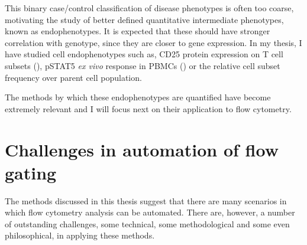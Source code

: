 This binary case/control classification of disease phenotypes is often too coarse, motivating the study of better defined quantitative intermediate phenotypes, known as endophenotypes.
It is expected that these should have stronger correlation with genotype, since they are closer to gene expression.
In my thesis, I have studied cell endophenotypes such as, CD25 protein expression on T cell subsets (), pSTAT5 \textit{ex vivo} response in \glspl{PBMC} () or the relative cell subset frequency over parent cell population.

The methods by which these endophenotypes are quantified have become extremely relevant and I will focus next on their application to flow cytometry.



\section{ Challenges in automation of flow gating }

The methods discussed in this thesis suggest that there are many scenarios in which flow cytometry analysis can be automated.
There are, however, a number of outstanding challenges, some technical, some methodological and some even philosophical, in applying these methods.


